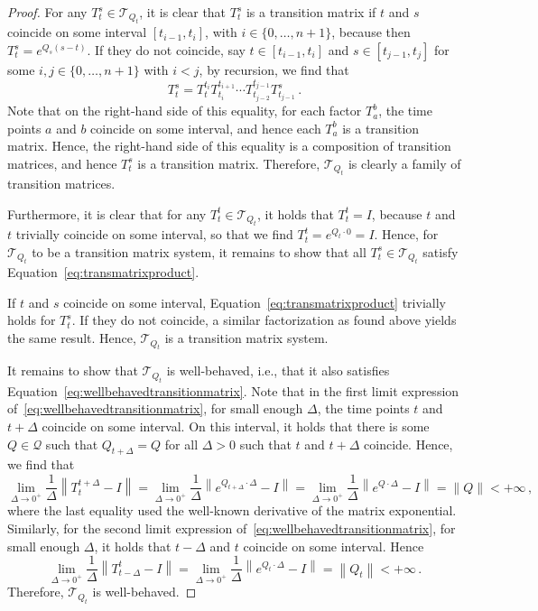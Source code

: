 \documentclass[10pt]{paper}
\theoremstyle{definition}
\newcommand{\rateset}{\mathcal{Q}}
\newcommand{\norm}[1]{\left\lVert #1 \right\rVert}
\begin{document}
\begin{proof}
For any $T_t^s\in\mathcal{T}_{Q_t}$, it is clear that $T_t^s$ is a transition matrix if $t$ and $s$ coincide on some interval $[t_{i-1},t_i]$, with $i\in\{0,\ldots,n+1\}$, because then $T_t^s=e^{Q_s(s-t)}$. If they do not coincide, say $t\in[t_{i-1},t_i]$ and $s\in[t_{j-1},t_j]$ for some $i,j\in\{0,\ldots,n+1\}$ with $i<j$, by recursion, we find that
\begin{equation*}
T_t^s = T_t^{t_i}T_{t_i}^{t_{i+1}}\cdots T_{t_{j-2}}^{t_{j-1}}T_{t_{j-1}}^s\,.
\end{equation*}
Note that on the right-hand side of this equality, for each factor $T_a^b$, the time points $a$ and $b$ coincide on some interval, and hence each $T_a^b$ is a transition matrix. Hence, the right-hand side of this equality is a composition of transition matrices, and hence $T_t^s$ is a transition matrix. Therefore, $\mathcal{T}_{Q_t}$ is clearly a family of transition matrices.

Furthermore, it is clear that for any $T_t^t\in\mathcal{T}_{Q_t}$, it holds that $T_t^t=I$, because $t$ and $t$ trivially coincide on some interval, so that we find $T_t^t=e^{Q_t\cdot 0}=I$. Hence, for $\mathcal{T}_{Q_t}$ to be a transition matrix system, it remains to show that all $T_t^s\in\mathcal{T}_{Q_t}$ satisfy Equation~\eqref{eq:transmatrixproduct}.

If $t$ and $s$ coincide on some interval, Equation~\eqref{eq:transmatrixproduct} trivially holds for $T_t^s$. If they do not coincide, a similar factorization as found above yields the same result. Hence, $\mathcal{T}_{Q_t}$ is a transition matrix system. 

It remains to show that $\mathcal{T}_{Q_t}$ is well-behaved, i.e., that it also satisfies Equation~\eqref{eq:wellbehavedtransitionmatrix}.
Note that in the first limit expression of~\eqref{eq:wellbehavedtransitionmatrix}, for small enough $\Delta$, the time points $t$ and $t+\Delta$ coincide on some interval. On this interval, it holds that there is some $Q\in\rateset$ such that $Q_{t+\Delta}=Q$ for all $\Delta>0$ such that $t$ and $t+\Delta$ coincide. Hence, we find that
\begin{equation*}
\lim_{\Delta\to0^+}\frac{1}{\Delta}\norm{T_t^{t+\Delta}-I} = \lim_{\Delta\to0^+}\frac{1}{\Delta}\norm{e^{Q_{t+\Delta}\cdot\Delta}-I} = \lim_{\Delta\to0^+}\frac{1}{\Delta}\norm{e^{Q\cdot\Delta}-I} = \norm{Q} < +\infty\,,
\end{equation*}
where the last equality used the well-known derivative of the matrix exponential. Similarly, for the second limit expression of~\eqref{eq:wellbehavedtransitionmatrix}, for small enough $\Delta$, it holds that $t-\Delta$ and $t$ coincide on some interval. Hence
\begin{equation*}
\lim_{\Delta\to0^+}\frac{1}{\Delta}\norm{T_{t-\Delta}^{t}-I} = \lim_{\Delta\to0^+}\frac{1}{\Delta}\norm{e^{Q_t\cdot \Delta}-I}=\norm{Q_t}<+\infty\,.
\end{equation*}
Therefore, $\mathcal{T}_{Q_t}$ is well-behaved.
\end{proof}
\end{document}
